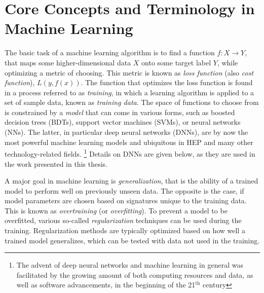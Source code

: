 \section{Core Concepts and Terminology in Machine Learning}
The basic task of a machine learning algorithm is to find a function $f: X \rightarrow Y$, that maps some higher-dimensional data $X$ onto some target label $Y$, while optimizing a metric of choosing.
This metric is known as \emph{loss function} (also \emph{cost function}), $L(y, f(x))$.
The function that optimizes the loss function is found in a process referred to as \emph{training}, in which a learning algorithm is applied to a set of sample data, known as \emph{training data}.
The space of functions to choose from is constrained by a \emph{model} that can come in various forms, such as boosted decision trees (BDTs), support vector machines (SVMs), or neural networks (NNs). The latter, in particular deep neural networks (DNNs), are by now the most powerful machine learning models and ubiquitous in HEP and many other technology-related fields.  \footnote{The advent of deep neural networks and machine learning in general was facilitated by the growing amount of both computing resources and data, as well as software advancements, in the beginning of the 21$^{\text{th}}$ century}
Details on DNNs are given below, as they are used in the work presented in this thesis.



A major goal in machine learning is \emph{generalization}, that is the ability of a trained model to perform well on previously unseen data.
The opposite is the case, if model parameters are chosen based on signatures unique to the training data. This is known as \emph{overtraining} (or \emph{overfitting}). To prevent a model to be overfitted, various so-called \emph{regularization} techniques can be used during the training.
Regularization methods are typically optimized based on how well a trained model generalizes, which can be tested with data not used in the training.


